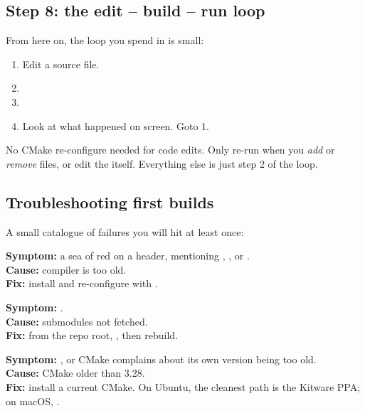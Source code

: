 \subsection{Step 8: the edit -- build -- run loop}

From here on, the loop you spend in is small:

\begin{enumerate}[leftmargin=*]
  \item Edit a source file.
  \item {}
  \item {}
  \item Look at what happened on screen. Goto 1.
\end{enumerate}

No CMake re-configure needed for code edits. Only re-run
 when you \emph{add} or \emph{remove} files, or
edit the  itself. Everything else is just step
2 of the loop.

\subsection{Troubleshooting first builds}

A small catalogue of failures you will hit at least once:

\begin{warning}
\textbf{Symptom:} a sea of red on a header, mentioning
, , or .\\
\textbf{Cause:} compiler is too old.\\
\textbf{Fix:} install  and re-configure with
.
\end{warning}

\begin{warning}
\textbf{Symptom:} .\\
\textbf{Cause:} submodules not fetched.\\
\textbf{Fix:} from the repo root, , then rebuild.
\end{warning}

\begin{warning}
\textbf{Symptom:} , or CMake complains
about its own version being too old.\\
\textbf{Cause:} CMake older than 3.28.\\
\textbf{Fix:} install a current CMake. On Ubuntu, the cleanest path
is the Kitware PPA; on macOS, .
\end{warning}

